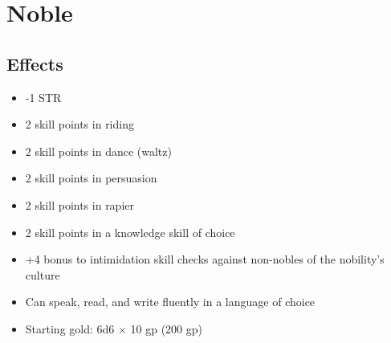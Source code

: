 \section{Noble}\label{background:noble}

\subsection*{Effects}
\begin{itemize}
    \item -1 STR
    \item 2 skill points in riding
    \item 2 skill points in dance (waltz)
    \item 2 skill points in persuasion
    \item 2 skill points in rapier
    \item 2 skill points in a knowledge skill of choice
    \item +4 bonus to intimidation skill checks against non-nobles of the
        nobility's culture
    \item Can speak, read, and write fluently in a language of choice
    \item Starting gold: 6d6 $\times$ 10 gp (200 gp)
\end{itemize}
